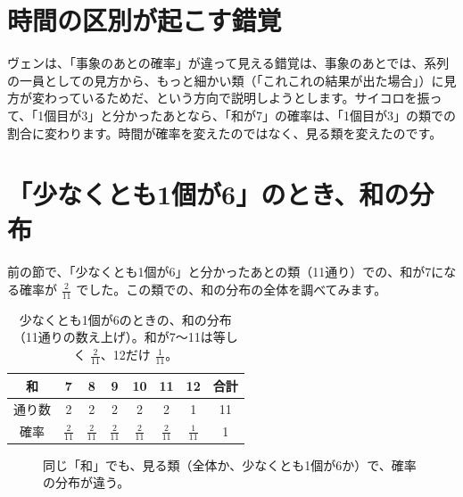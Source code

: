 \documentclass[a4paper,11pt,openany]{ltjsbook}
\begin{document}
\section{時間の区別が起こす錯覚}

ヴェンは、「事象のあとの確率」が違って見える錯覚は、事象のあとでは、系列の一員としての見方から、もっと細かい類（「これこれの結果が出た場合」）に見方が変わっているためだ、という方向で説明しようとします。サイコロを振って、「1個目が3」と分かったあとなら、「和が7」の確率は、「1個目が3」の類での割合に変わります。時間が確率を変えたのではなく、見る類を変えたのです。

\section{「少なくとも1個が6」のとき、和の分布}

前の節で、「少なくとも1個が6」と分かったあとの類（11通り）での、和が7になる確率が $\tfrac2{11}$ でした。この類での、和の分布の全体を調べてみます。

\begin{table}[htbp]
\centering
\begin{tabular}{c|cccccc|c}
\toprule
和 & 7 & 8 & 9 & 10 & 11 & 12 & 合計\\
\midrule
通り数 & 2 & 2 & 2 & 2 & 2 & 1 & 11\\
確率 & $\tfrac2{11}$ & $\tfrac2{11}$ & $\tfrac2{11}$ & $\tfrac2{11}$ & $\tfrac2{11}$ & $\tfrac1{11}$ & 1\\
\bottomrule
\end{tabular}
\caption{少なくとも1個が6のときの、和の分布（11通りの数え上げ）。和が7〜11は等しく $\tfrac2{11}$、12だけ $\tfrac1{11}$。}
\end{table}

\begin{figure}[htbp]
\centering
{}
\caption{同じ「和」でも、見る類（全体か、少なくとも1個が6か）で、確率の分布が違う。}
\end{figure}
\end{document}
